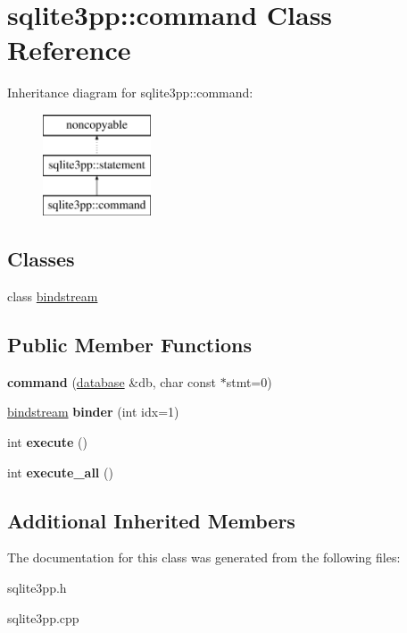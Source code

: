 \hypertarget{classsqlite3pp_1_1command}{\section{sqlite3pp\-:\-:command Class Reference}
\label{classsqlite3pp_1_1command}
}
Inheritance diagram for sqlite3pp\-:\-:command\-:\begin{figure}[H]
\begin{center}
\leavevmode
\includegraphics[height=3.000000cm]{classsqlite3pp_1_1command}
\end{center}
\end{figure}
\subsection*{Classes}
\begin{DoxyCompactItemize}
\item 
class \hyperlink{classsqlite3pp_1_1command_1_1bindstream}{bindstream}
\end{DoxyCompactItemize}
\subsection*{Public Member Functions}
\begin{DoxyCompactItemize}
\item 
\hypertarget{classsqlite3pp_1_1command_a25816f7a1f3825982fddbcbb5bb086f0}{{\bfseries command} (\hyperlink{classsqlite3pp_1_1database}{database} \&db, char const $\ast$stmt=0)}\label{classsqlite3pp_1_1command_a25816f7a1f3825982fddbcbb5bb086f0}

\item 
\hypertarget{classsqlite3pp_1_1command_aa2754e08a750704e08d8fe1cc0edaba8}{\hyperlink{classsqlite3pp_1_1command_1_1bindstream}{bindstream} {\bfseries binder} (int idx=1)}\label{classsqlite3pp_1_1command_aa2754e08a750704e08d8fe1cc0edaba8}

\item 
\hypertarget{classsqlite3pp_1_1command_adcc7aae09d6c10448cb7436621fd3417}{int {\bfseries execute} ()}\label{classsqlite3pp_1_1command_adcc7aae09d6c10448cb7436621fd3417}

\item 
\hypertarget{classsqlite3pp_1_1command_a8ea7613b0b8023124f3a85c0553042e0}{int {\bfseries execute\-\_\-all} ()}\label{classsqlite3pp_1_1command_a8ea7613b0b8023124f3a85c0553042e0}

\end{DoxyCompactItemize}
\subsection*{Additional Inherited Members}


The documentation for this class was generated from the following files\-:\begin{DoxyCompactItemize}
\item 
sqlite3pp.\-h\item 
sqlite3pp.\-cpp\end{DoxyCompactItemize}
